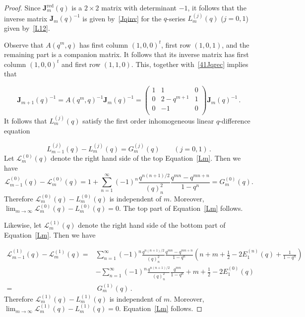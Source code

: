 \documentclass[12pt,reqno]{amsart}
\theoremstyle{definition}
\def\calL{\mathcal L}
\def\bJ{\mathbf J}
\def\RED{\mathrm{red}}
\begin{document}
\begin{proof}
Since $\bJ^\RED_{m}(q)$ is a $2 \times 2$ matrix with determinant $-1$, it follows
that the inverse matrix $\bJ_{m}(q)^{-1}$ is given by~\eqref{Jqinv} for the 
$q$-series $L_m^{(j)}(q)$ ($j=0,1$) given by~\eqref{L12}.

Observe that $A(q^m,q)$ has first column $(1,0,0)^t$, first row $(1,0,1)$, and
the remaining part is a companion matrix. It follows that its inverse matrix
has first column $(1,0,0)^t$ and first row $(1,1,0)$. This, together
with~\eqref{41Jqrec} implies that

\begin{equation}
\bJ_{m+1}(q)^{-1} = A(q^m,q)^{-1} \bJ_{m}(q)^{-1} =
\begin{pmatrix}
1 & 1 & 0\\
0 & 2-q^{m+1} & 1\\
0 & -1 & 0\\
\end{pmatrix}
\bJ_{m}(q)^{-1} \,.
\end{equation}
It follows that $L_m^{(j)}(q)$ satisfy the first order inhomogeneous linear
$q$-difference equation

\begin{equation}
L^{(j)}_{m-1}(q)-L^{(j)}_{m}(q) =
G_{m}^{(j)}(q)  \qquad (j=0,1) \,.
\end{equation}
Let $\calL^{(0)}_m(q)$ denote the right hand side of the top Equation~\eqref{Lm}.  
Then we have
\[
\calL^{(0)}_{m-1}(q)-\calL^{(0)}_{m}(q)
=
1+\sum_{n=1}^{\infty}(-1)^{n}\frac{q^{n(n+1)/2}}{(q)_{n}^{2}}\frac{q^{mn}-q^{mn+n}}{1-q^{n}}
=
G_{m}^{(0)}(q).
\]
Therefore $\calL^{(0)}_{m}(q)-L_{m}^{(0)}(q)$ is independent of $m$. Moreover,
$\lim_{m \to \infty} \calL^{(0)}_{m}(q)-L_{m}^{(0)}(q)=0$. The top part of
Equation~\eqref{Lm} follows.

Likewise, let $\calL^{(1)}_m(q)$ denote the right hand side of the bottom part of
Equation~\eqref{Lm}. Then we have

\begin{align*}
\calL^{(1)}_{m-1}(q)-\calL^{(1)}_{m}(q)
=&
\sum_{n=1}^{\infty}(-1)^{n}\frac{q^{n(n+1)/2}}{(q)_{n}^{2}}
\frac{q^{mn}-q^{mn+n}}{1-q^{n}}\left(n+m+\frac{1}{2}
  -2E^{(n)}_{1}(q)+\frac{1}{1-q^{n}}\right)\\
&-\sum_{n=1}^{\infty}(-1)^{n}\frac{q^{n(n+1)/2}}{(q)_{n}^{2}}
\frac{q^{mn}}{1-q^{n}}+m+\frac{1}{2}-2E^{(0)}_{1}(q)\\
=&\:
G^{(1)}_{m}(q) \,.
\end{align*}
Therefore $\calL^{(1)}_{m}(q)-L^{(1)}_{m}(q)$ is independent of $m$. Moreover,
$\lim_{m \to \infty} \calL^{(1)}_{m}(q)-L_{m}^{(1)}(q)=0$. Equation~\eqref{Lm} follows.
\end{proof}
\end{document}
